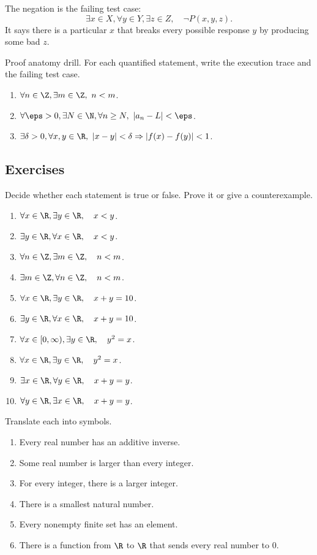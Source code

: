 The negation is the failing test case:
\[
\exists x\in X,\forall y\in Y,\exists z\in Z,\quad \neg P(x,y,z).
\]
It says there is a particular $x$ that breaks every possible response $y$ by producing some bad $z$.

\begin{labbox}
Proof anatomy drill. For each quantified statement, write the execution trace and the failing test case.
\begin{enumerate}
\item $\forall n\in\Z,\exists m\in\Z,\ n< m$.
\item $\forall \eps>0,\exists N\in\N,\forall n\geq N,\ |a_n-L|<\eps$.
\item $\exists \delta>0,\forall x,y\in\R,\ |x-y|<\delta\Rightarrow |f(x)-f(y)|<1$.
\end{enumerate}
\end{labbox}

\subsection{Exercises}

Decide whether each statement is true or false. Prove it or give a counterexample.

\begin{enumerate}
\item $\forall x\in\R,\exists y\in\R,\quad x<y$.
\item $\exists y\in\R,\forall x\in\R,\quad x<y$.
\item $\forall n\in\Z,\exists m\in\Z,\quad n<m$.
\item $\exists m\in\Z,\forall n\in\Z,\quad n<m$.
\item $\forall x\in\R,\exists y\in\R,\quad x+y=10$.
\item $\exists y\in\R,\forall x\in\R,\quad x+y=10$.
\item $\forall x\in[0,\infty),\exists y\in\R,\quad y^2=x$.
\item $\forall x\in\R,\exists y\in\R,\quad y^2=x$.
\item $\exists x\in\R,\forall y\in\R,\quad x+y=y$.
\item $\forall y\in\R,\exists x\in\R,\quad x+y=y$.
\end{enumerate}

Translate each into symbols.

\begin{enumerate}
\item Every real number has an additive inverse.
\item Some real number is larger than every integer.
\item For every integer, there is a larger integer.
\item There is a smallest natural number.
\item Every nonempty finite set has an element.
\item There is a function from $\R$ to $\R$ that sends every real number to $0$.
\end{enumerate}

